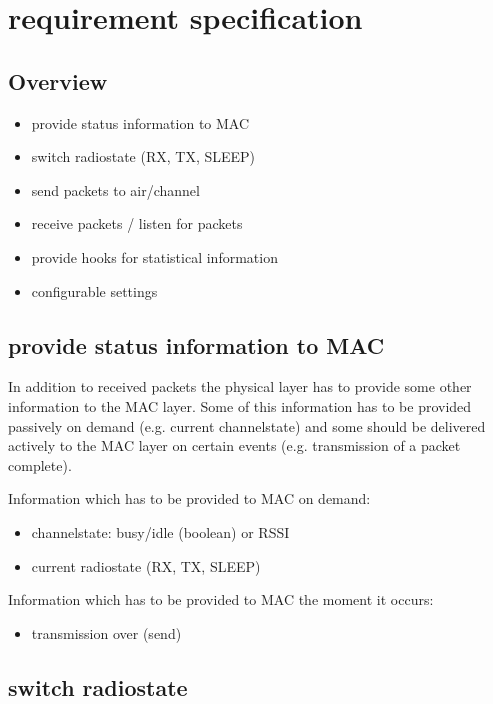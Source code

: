 \section{requirement specification}
\label{req_spec}

\subsection{Overview}
\label{overview}

\begin{itemize}
 \item provide status information to MAC
 \item switch radiostate (RX, TX, SLEEP)
 \item send packets to air/channel
 \item receive packets / listen for packets
 \item provide hooks for statistical information
 \item configurable settings
\end{itemize}

\subsection{provide status information to MAC}
\label{stateInfo}

In addition to received packets the physical layer has to provide some other information to the MAC layer.
Some of this information has to be provided passively on demand (e.g. current channelstate) and some should be delivered actively to the MAC layer on certain events (e.g. transmission of a packet complete).

\noindent Information which has to be provided to MAC on demand:
\begin{itemize}
 \item channelstate: busy/idle (boolean) or RSSI
 \item current radiostate (RX, TX, SLEEP)
\end{itemize}

\noindent Information which has to be provided to MAC the moment it occurs:
\begin{itemize}
 \item transmission over (send)
\end{itemize}

\pagebreak
\subsection{switch radiostate}
\label{switchstates}

